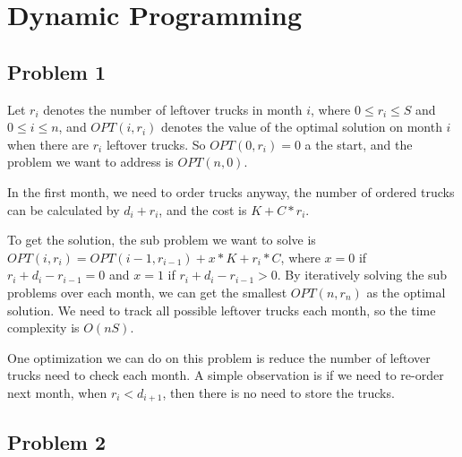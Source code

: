 \documentclass[paper=a4, fontsize=11pt]{scrartcl} %
\numberwithin{equation}{section} %
\numberwithin{figure}{section} %
\numberwithin{table}{section} %
\begin{document}
\section*{Dynamic Programming}


\subsection*{Problem 1}



Let $r_i$ denotes the number of leftover trucks in month $i$, where $0 \leq r_i \leq S$ and $0 \leq i \leq n$, and $OPT(i, r_i)$ denotes the value of the optimal solution on month $i$ when there are $r_i$ leftover trucks. So $OPT(0, r_i) = 0$ a the start, and the problem we want to address is $OPT(n, 0)$.

In the first month, we need to order trucks anyway, the number of ordered trucks can be calculated by $d_i + r_i$, and the cost is $K + C*r_i$. 

To get the solution, the sub problem we want to solve is $OPT(i, r_i) = OPT(i - 1, r_{i - 1}) + x*K + r_i*C$, where $x = 0$ if $r_i + d_i - r_{i-1} = 0$ and $x = 1$ if $r_i + d_i - r_{i-1} > 0$. By iteratively solving the sub problems over each month, we can get the smallest $OPT(n, r_n)$ as the optimal solution. We need to track all possible leftover trucks each month, so the time complexity is $O(nS)$.

One optimization we can do on this problem is reduce the number of leftover trucks need to check each month. A simple observation is if we need to re-order next month, when $r_i < d_{i+1}$, then there is no need to store the trucks. 


\subsection*{Problem 2}
\end{document}
